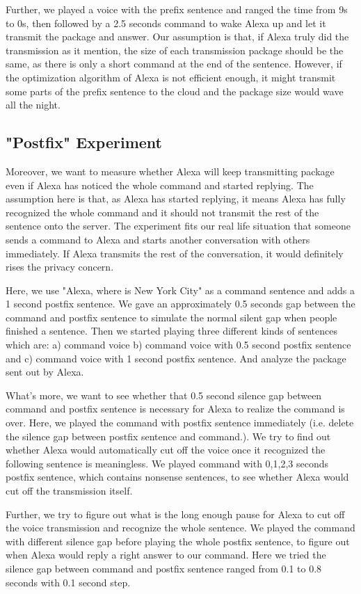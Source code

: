 Further, we played a voice with the prefix sentence and ranged the time from 9s to 0s, then followed by a 2.5 seconds command to wake Alexa up and let it transmit the package and answer. Our assumption is that, if Alexa truly did the transmission as it mention, the size of each transmission package should be the same, as there is only a short command at the end of the sentence. However, if the optimization algorithm of Alexa is not efficient enough, it might transmit some parts of the prefix sentence to the cloud and the package size would wave all the night.
 

\subsection{"Postfix" Experiment}
  
Moreover, we want to measure whether Alexa will keep transmitting package even if Alexa has noticed the whole command and started replying. The assumption here is that, as Alexa has started replying, it means Alexa has fully recognized the whole command and it should not transmit the rest of the sentence onto the server. The experiment fits our real life situation that someone sends a command to Alexa and starts another conversation with others immediately. If Alexa transmits the rest of the conversation, it would definitely rises the privacy concern.

Here, we use "Alexa, where is New York City" as a command sentence and adds a 1 second postfix sentence. We gave an approximately 0.5 seconds gap between the command and postfix sentence to simulate the normal silent gap when people finished a sentence. Then we started playing three different kinds of sentences which are: a) command voice b) command voice with 0.5 second postfix sentence and c) command voice with 1 second postfix sentence. And analyze the package sent out by Alexa.

What's more, we want to see whether that 0.5 second silence gap between command and postfix sentence is necessary for Alexa to realize the command is over. Here, we played the command with postfix sentence immediately (i.e. delete the silence gap between postfix sentence and command.). We try to find out whether Alexa would automatically cut off the voice once it recognized the following sentence is meaningless. We played command with 0,1,2,3 seconds postfix sentence, which contains nonsense sentences, to see whether Alexa would cut off the transmission itself.

Further, we try to figure out what is the long enough pause for Alexa to cut off the voice transmission and recognize the whole sentence. We played the command with different silence gap before playing the whole postfix sentence, to figure out when Alexa would reply a right answer to our command. Here we tried the silence gap between command and postfix sentence ranged from 0.1 to 0.8 seconds with 0.1 second step.

